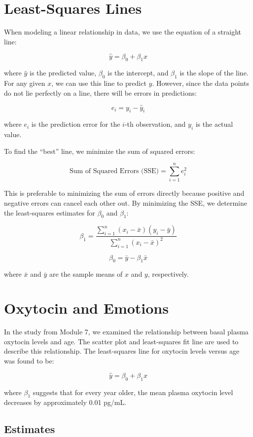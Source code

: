 \documentclass{article}
\begin{document}
\section{Least-Squares Lines}

When modeling a linear relationship in data, we use the equation of a straight line:

\[
\hat{y} = \beta_0 + \beta_1 x
\]

where \( \hat{y} \) is the predicted value, \( \beta_0 \) is the intercept, and \( \beta_1 \) is the slope of the line. For any given \( x \), we can use this line to predict \( y \). However, since the data points do not lie perfectly on a line, there will be errors in predictions:

\[
e_i = y_i - \hat{y}_i
\]

where \( e_i \) is the prediction error for the \( i \)-th observation, and \( y_i \) is the actual value.

To find the “best” line, we minimize the sum of squared errors:

\[
\text{Sum of Squared Errors (SSE)} = \sum_{i=1}^n e_i^2
\]

This is preferable to minimizing the sum of errors directly because positive and negative errors can cancel each other out. By minimizing the SSE, we determine the least-squares estimates for \( \beta_0 \) and \( \beta_1 \):

\[
\beta_1 = \frac{\sum_{i=1}^n (x_i - \bar{x})(y_i - \bar{y})}{\sum_{i=1}^n (x_i - \bar{x})^2}
\]

\[
\beta_0 = \bar{y} - \beta_1 \bar{x}
\]

where \( \bar{x} \) and \( \bar{y} \) are the sample means of \( x \) and \( y \), respectively.

\section{Oxytocin and Emotions}

In the study from Module 7, we examined the relationship between basal plasma oxytocin levels and age. The scatter plot and least-squares fit line are used to describe this relationship. The least-squares line for oxytocin levels versus age was found to be:

\[
\hat{y} = \beta_0 + \beta_1 x
\]

where \( \beta_1 \) suggests that for every year older, the mean plasma oxytocin level decreases by approximately 0.01 pg/mL.

\subsection{Estimates}
\end{document}
